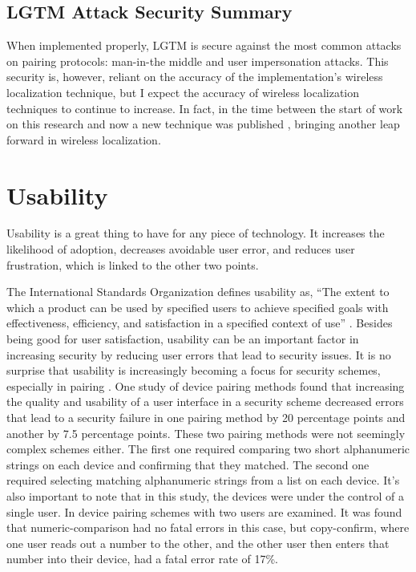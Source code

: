 \documentclass[12pt]{report}
\begin{document}
\subsection{LGTM Attack Security Summary}
When implemented properly, LGTM is secure against the most common attacks on pairing protocols: man-in-the middle and user impersonation attacks. This security is, however, reliant on the accuracy of the implementation's wireless localization technique, but I expect the accuracy of wireless localization techniques to continue to increase. In fact, in the time between the start of work on this research and now a new technique was published \cite{ChronosSingleAPLocalizationVasisht2016}, bringing another leap forward in wireless localization. \par


\section{Usability}
Usability is a great thing to have for any piece of technology. It increases the likelihood of adoption, decreases avoidable user error, and reduces user frustration, which is linked to the other two points. \par

The International Standards Organization defines usability as, ``The extent to which a product can be used by specified users to achieve specified goals with effectiveness, efficiency, and satisfaction in a specified context of use'' \cite{UsabilityISO1998}. Besides being good for user satisfaction, usability can be an important factor in increasing security by reducing user errors that lead to security issues. It is no surprise that usability is increasingly becoming a focus for security schemes, especially in pairing \cite{UsabilitySecurityOutOfBandPairingKainda2009,UserPerceptionPairing,PlayfulPairingGallego2011,AliceMeetsBobKumar2009,SecurePairingUsabilityUzun2007,ConferenceCompStudySecurePairingKumar2009}. One study of device pairing methods \cite{SecurePairingUsabilityUzun2007} found that increasing the quality and usability of a user interface in a security scheme decreased errors that lead to a security failure in one pairing method by 20 percentage points and another by 7.5 percentage points. These two pairing methods were not seemingly complex schemes either. The first one required comparing two short alphanumeric strings on each device and confirming that they matched. The second one required selecting matching alphanumeric strings from a list on each device. It's also important to note that in this study, the devices were under the control of a single user. In \cite{AliceMeetsBobKumar2009} device pairing schemes with two users are examined. It was found that numeric-comparison had no fatal errors in this case, but copy-confirm, where one user reads out a number to the other, and the other user then enters that number into their device, had a fatal error rate of 17\%. \par
\end{document}
